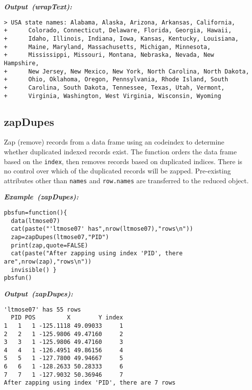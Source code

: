 \documentclass[letterpaper,12pt,fleqn]{article}
\def\tab{\hspace{0.5 in}}
\newcommand{\code}[1]{\small\texttt{#1}\normalsize}
\newcommand\example[1]{    %
	\textbf{\emph{Example~(#1):}}\\ \vspace{3 pt}
}
\newcommand\results[1]{    %
	\textbf{\emph{Output~(#1):}}\\ \vspace{3 pt}
}
\begin{document}
\begin{outputbox}
\results{wrapText}
\begin{Verbatim}[fontsize=\footnotesize]
> USA state names: Alabama, Alaska, Arizona, Arkansas, California,
+      Colorado, Connecticut, Delaware, Florida, Georgia, Hawaii,
+      Idaho, Illinois, Indiana, Iowa, Kansas, Kentucky, Louisiana,
+      Maine, Maryland, Massachusetts, Michigan, Minnesota,
+      Mississippi, Missouri, Montana, Nebraska, Nevada, New Hampshire,
+      New Jersey, New Mexico, New York, North Carolina, North Dakota,
+      Ohio, Oklahoma, Oregon, Pennsylvania, Rhode Island, South
+      Carolina, South Dakota, Tennessee, Texas, Utah, Vermont,
+      Virginia, Washington, West Virginia, Wisconsin, Wyoming
\end{Verbatim}
\end{outputbox}

\subsection {zapDupes}

\tab Zap (remove) records from a data frame using an code{index} to determine whether duplicated indexed records exist.  The function orders the data frame based on the \code{index}, then removes records based on duplicated indices. There is no control over which of the duplicated records will be zapped. Pre-existing attributes other than \code{names} and \code{row.names} are transferred to the reduced object.

\begin{examplebox}
\example{zapDupes}
\begin{Verbatim}[fontsize=\footnotesize]
pbsfun=function(){
  data(ltmose07)
  cat(paste("'ltmose07' has",nrow(ltmose07),"rows\n"))
  zap=zapDupes(ltmose07,"PID")
  print(zap,quote=FALSE)
  cat(paste("After zapping using index 'PID', there are",nrow(zap),"rows\n"))
  invisible() }
pbsfun()
\end{Verbatim}
\end{examplebox}

\begin{outputbox}
\results{zapDupes}
\begin{Verbatim}[fontsize=\footnotesize]
'ltmose07' has 55 rows
  PID POS         X        Y index
1   1   1 -125.1118 49.09033     1
2   2   1 -125.9806 49.47160     2
3   3   1 -125.9806 49.47160     3
4   4   1 -126.4951 49.86156     4
5   5   1 -127.7800 49.94667     5
6   6   1 -128.2633 50.28333     6
7   7   1 -127.9032 50.36946     7
After zapping using index 'PID', there are 7 rows
\end{Verbatim}
\end{outputbox}
\end{document}
